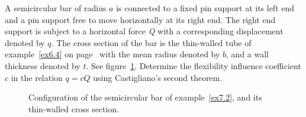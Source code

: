\documentclass{AeroStructure-ERJohnson}
\begin{document}
\begin{example}\label{ex7.2}A semicircular bar of radius $a$ is connected to a fixed pin support at its left end and a pin support free to move horizontally at its right end. The right end support is subject to a horizontal force \textit{Q} with a corresponding displacement denoted by $q$. The cross section of the bar is the thin-walled tube of example~\ref{ex6.4} on page~\pageref{ex6.4} with the mean radius denoted by $b$, and a wall thickness denoted by $t$. See figure~\ref{fig7.5}. Determine the flexibility influence coefficient $c$ in the relation $q=c Q$ using Castigliano's second theorem.

{\def\thefigure{7.5}
\begin{figure}[!h]
\caption{Configuration of the semicircular bar of example~\ref{ex7.2}, and its thin-walled cross section.\label{fig7.5}}
\end{figure}}


\end{example}
\end{document}
